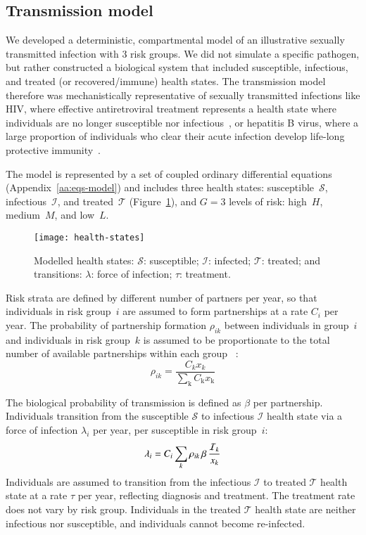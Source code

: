 \subsection{Transmission model}\label{ss:model-sim}
We developed a deterministic, compartmental model of an illustrative
sexually transmitted infection with 3 risk groups.
We did not simulate a specific pathogen, but rather constructed a biological system
that included susceptible, infectious, and treated (or recovered/immune) health states.
The transmission model therefore was mechanistically representative of
sexually transmitted infections like
HIV, where effective antiretroviral treatment represents a health state where
individuals are no longer susceptible nor infectious~\citep{Maartens2014}, or
hepatitis B virus, where a large proportion of individuals who clear their acute infection
develop life-long protective immunity~\citep{Ganem2004}.
\par
The model is represented by a set of coupled ordinary differential equations
(Appendix~\ref{aa:eqs-model}) and includes
three health states:
susceptible~$\mathcal{S}$, infectious~$\mathcal{I}$, and treated~$\mathcal{T}$
(Figure~\ref{fig:health-states}),
and $G = 3$ levels of risk:
high~$H$, medium~$M$, and low~$L$.
\begin{figure}
  \centerline{\texttt{[image: health-states]}}
  \caption{Modelled health states:
    $\mathcal{S}$: susceptible;
    $\mathcal{I}$: infected;
    $\mathcal{T}$: treated;
    and transitions:
    $\lambda$: force of infection;
    $\tau$: treatment.}
  \label{fig:health-states}
\end{figure}
Risk strata are defined by different number of partners per year,
so that individuals in risk group~$i$ are assumed to
form partnerships at a rate $C_{i}$ per year.
The probability of partnership formation $\rho_{ik}$ between individuals in group~$i$
and individuals in risk group~$k$ is assumed to be
proportionate to the total number of available partnerships within each group%
~\cite{Garnett1994}:
\begin{equation}
\rho_{ik} = \frac
{C_k x_k}
{\sum_{\mathrm{k}}C_{\mathrm{k}} x_{\mathrm{k}}}
\label{eq:rho}
\end{equation}
\par
The biological probability of transmission is defined as $\beta$ per partnership.
Individuals transition from the
susceptible $\mathcal{S}$ to infectious $\mathcal{I}$ health state
via a force of infection $\lambda_i$ per year, per susceptible in risk group~$i$:
\begin{equation}
\lambda_{i} =
C_{i} \sum_k \rho_{ik} \thinspace  \beta \thinspace \frac{\mathcal{I}_k}{x_k}
\label{eq:foi}
\end{equation}
Individuals are assumed to transition from the
infectious $\mathcal{I}$ to treated $\mathcal{T}$ health state
at a rate $\tau$ per year, reflecting diagnosis and treatment.
The treatment rate does not vary by risk group.
Individuals in the treated $\mathcal{T}$ health state are neither infectious nor susceptible,
and individuals cannot become re-infected.
